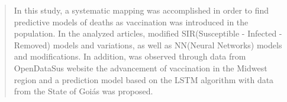 
\begin{abstract}{In this study, a systematic mapping was accomplished in order to find predictive models of deaths as vaccination was introduced in the population. In the analyzed articles, modified SIR(Susceptible - Infected - Removed) models and variations, as well as NN(Neural Networks) models and modifications. In addition, was observed through data from OpenDataSus website the advancement of vaccination in the Midwest region and a prediction model based on the LSTM algorithm with data from the State of Goiás was proposed.}
\end{abstract}
